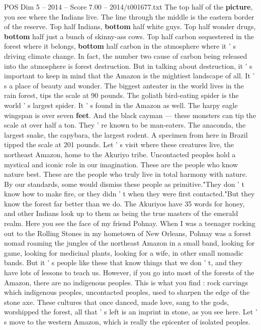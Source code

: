 \begin{textsample}{POS Dim 5 – 2014 – Score 7.00 – 2014/t001677.txt}
The top half of the \textbf{picture}, you see where the Indians live.
The line through the middle is the eastern border of the reserve.
Top half Indians, \textbf{bottom} half white guys.
Top half wonder drugs, \textbf{bottom} half just a bunch of skinny-ass cows.
Top half carbon sequestered in the forest where it belongs, \textbf{bottom} half carbon in the atmosphere where it ' s driving climate change.
In fact, the number two cause of carbon being released into the atmosphere is forest destruction.
But in talking about destruction, it ' s important to keep in mind that the Amazon is the mightiest landscape of all.
It ' s a place of beauty and wonder.
The biggest anteater in the world lives in the rain forest, tips the scale at 90 pounds.
The goliath bird-eating spider is the world ' s largest spider.
It ' s found in the Amazon as well.
The harpy eagle wingspan is over seven \textbf{feet}.
And the black cayman — these monsters can tip the scale at over half a ton.
They ' re known to be man-eaters.
The anaconda, the largest snake, the capybara, the largest rodent.
A specimen from here in Brazil tipped the scale at 201 pounds.
Let ' s visit where these creatures live, the northeast Amazon, home to the Akuriyo tribe.
Uncontacted peoples hold a mystical and iconic role in our imagination.
These are the people who know nature best.
These are the people who truly live in total harmony with nature.
By our standards, some would dismiss these people as primitive."They don ' t know how to make fire, or they didn ' t when they were first contacted."But they know the forest far better than we do.
The Akuriyos have 35 words for honey, and other Indians look up to them as being the true masters of the emerald realm.
Here you see the face of my friend Pohnay.
When I was a teenager rocking out to the Rolling Stones in my hometown of New Orleans, Pohnay was a forest nomad roaming the jungles of the northeast Amazon in a small band, looking for game, looking for medicinal plants, looking for a wife, in other small nomadic bands.
But it ' s people like these that know things that we don ' t, and they have lots of lessons to teach us.
However, if you go into most of the forests of the Amazon, there are no indigenous peoples.
This is what you find : rock carvings which indigenous peoples, uncontacted peoples, used to sharpen the edge of the stone axe.
These cultures that once danced, made love, sang to the gods, worshipped the forest, all that ' s left is an imprint in stone, as you see here.
Let ' s move to the western Amazon, which is really the epicenter of isolated peoples.

\end{textsample}
